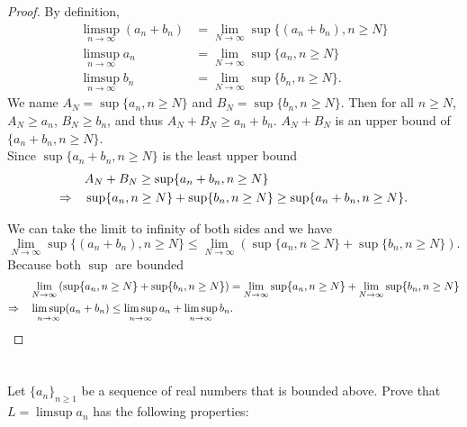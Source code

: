 \documentclass[11pt,letterpaper]{article}
\begin{document}
\begin{proof}
By definition, 
\begin{align*}
    \limsup_{n\rightarrow\infty}(a_n+b_n) &= \lim_{N\rightarrow\infty} \sup \{(a_n+b_n), n\geq N\}\\
    \limsup_{n\rightarrow\infty}a_n &= \lim_{N\rightarrow\infty} \sup \{a_n, n\geq N\}\\
    \limsup_{n\rightarrow\infty}b_n &= \lim_{N\rightarrow\infty} \sup \{b_n, n\geq N\}.
\end{align*}
We name $A_N = \sup \{a_n, n\geq N\}$ and $B_N = \sup \{b_n, n\geq N\}$. Then for all $n\geq N$, $A_N\geq a_n$, $B_N\geq b_n$, and thus $A_N+B_N\geq a_n+b_n$. $A_N+B_N$ is an upper bound of $\{a_n+b_n, n\geq N\}$. \\
Since $\sup \{a_n+b_n, n\geq N\}$ is the least upper bound 
\begin{align*}
    &A_N+B_N\geq \sup \{a_n+b_n, n\geq N\}\\
    \Rightarrow \quad &\sup \{a_n, n\geq N\}+\sup \{b_n, n\geq N\} \geq \sup \{a_n+b_n, n\geq N\}.
\end{align*}

We can take the limit to infinity of both sides and we have 
$$\lim_{N\rightarrow\infty} \sup \{(a_n+b_n), n\geq N\}\leq \lim_{N\rightarrow\infty} \left(\sup \{a_n, n\geq N\}+\sup \{b_n, n\geq N\}\right).$$ Because both $\sup$ are bounded 
\begin{align*}
    &\lim_{N\rightarrow\infty} \left(\sup \{a_n, n\geq N\}+\sup \{b_n, n\geq N\}\right)=\lim_{N\rightarrow\infty} \sup \{a_n, n\geq N\}+\lim_{N\rightarrow\infty} \sup \{b_n, n\geq N\} \\
    \Rightarrow \quad &\limsup_{n\rightarrow\infty}(a_n+b_n) \leq \limsup_{n\rightarrow\infty}a_n+\limsup_{n\rightarrow\infty}b_n.
\end{align*}
\end{proof}


\section{}
Let $\{a_n\}_{n\geq 1}$ be a sequence of real numbers that is bounded above.
Prove that $L = \limsup a_n$ has the following properties:
\end{document}

